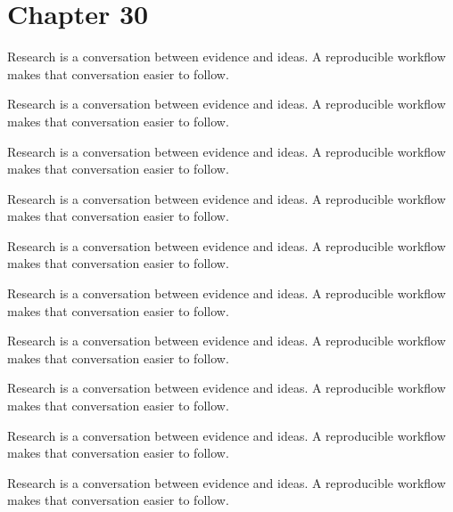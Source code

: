 \section*{Chapter 30}
Research is a conversation between evidence and ideas. A reproducible workflow makes that conversation easier to follow.

Research is a conversation between evidence and ideas. A reproducible workflow makes that conversation easier to follow.

Research is a conversation between evidence and ideas. A reproducible workflow makes that conversation easier to follow.

Research is a conversation between evidence and ideas. A reproducible workflow makes that conversation easier to follow.

Research is a conversation between evidence and ideas. A reproducible workflow makes that conversation easier to follow.

Research is a conversation between evidence and ideas. A reproducible workflow makes that conversation easier to follow.

Research is a conversation between evidence and ideas. A reproducible workflow makes that conversation easier to follow.

Research is a conversation between evidence and ideas. A reproducible workflow makes that conversation easier to follow.

Research is a conversation between evidence and ideas. A reproducible workflow makes that conversation easier to follow.

Research is a conversation between evidence and ideas. A reproducible workflow makes that conversation easier to follow.

\newpage
